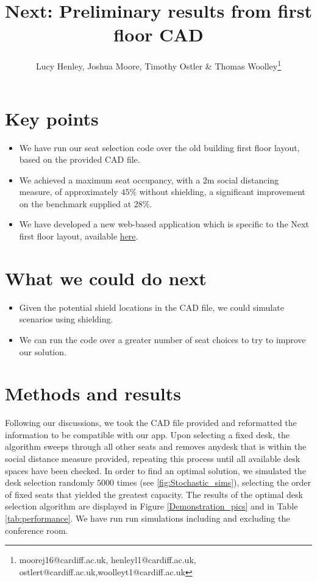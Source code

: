 \documentclass[11pt,a4paper]{article}
\title{Next: Preliminary results from first floor CAD}
\author{Lucy Henley, Joshua Moore, Timothy Ostler \& Thomas Woolley\footnote{moorej16@cardiff.ac.uk, henleyl1@cardiff.ac.uk, ostlert@cardiff.ac.uk,woolleyt1@cardiff.ac.uk}}
\begin{document}
\maketitle

\section*{Key points}
\begin{itemize}
\item We have run our seat selection code over the old building first floor layout, based on the provided CAD file.
\item We achieved a maximum seat occupancy, with a $2$m social distancing measure, of approximately $45\%$ without shielding, a significant improvement on the benchmark supplied at $28\%$.
\item We have developed a new web-based application which is specific to the Next first floor layout, available \href{https://lucyhenley.shinyapps.io/Next_seating/?fbclid=IwAR2Rx-OmoSkYHlw6BnQSKLgJGQt7VJvaX2IJYbqgKu4MK9YZxoZn1gBBAaEp}{here}. %
\end{itemize}

\section*{What we could do next}
\begin{itemize}
\item Given the potential shield locations in the CAD file, we could simulate scenarios using shielding.
\item We can run the code over a greater number of seat choices to try to improve  our solution.
\end{itemize}



\section*{Methods and results}
Following our discussions, we took the CAD file provided and reformatted the information to be compatible with our app. Upon selecting a fixed desk, the algorithm sweeps through all other seats and removes anydesk that is within the social distance measure provided, repeating this process until all available desk spaces have been checked. In order to find an optimal solution, we simulated the desk selection randomly $5000$ times (see \autoref{fig:Stochastic_sims}), selecting the order of fixed seats that yielded the greatest capacity. The results of the optimal desk selection algorithm are displayed in Figure \ref{Demonstration_pics} and in Table \ref{tab:performance}.  We have run run simulations including and excluding the conference room.
\end{document}
